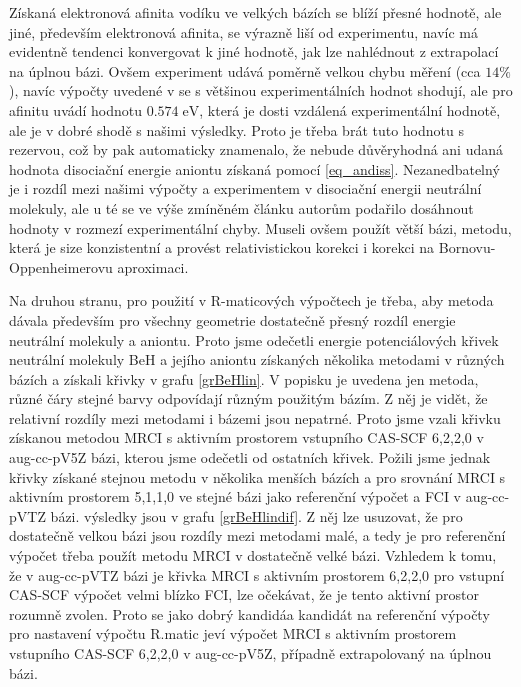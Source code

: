 Získaná elektronová afinita vodíku ve velkých bázích se blíží přesné 
hodnotě, ale jiné, především elektronová afinita, se výrazně liší od 
experimentu, navíc má evidentně tendenci konvergovat k jiné hodnotě, jak lze nahlédnout 
z extrapolací na úplnou bázi. Ovšem experiment udává poměrně velkou chybu měření (cca $14\%$),
navíc výpočty uvedené v \cite{Koput_BeH, Koput_BeHan} se s většinou experimentálních  
hodnot shodují, ale pro afinitu uvádí hodnotu $0.574\;\mathrm{eV}$, která je dosti 
vzdálená 
experimentální hodnotě, ale je v dobré shodě s našimi výsledky. Proto je třeba brát tuto hodnotu s rezervou, což by pak automaticky znamenalo, že nebude 
důvěryhodná ani udaná hodnota disociační energie aniontu získaná pomocí
\eqref{eq_andiss}. Nezanedbatelný je i rozdíl mezi našimi výpočty a experimentem v 
disociační energii neutrální molekuly, ale u té se ve výše zmíněném článku 
\cite{Koput_BeH} autorům podařilo dosáhnout hodnoty v rozmezí experimentální chyby.
Museli ovšem použít větší bázi,  
metodu, která je size konzistentní a provést relativistickou korekci i korekci na 
Bornovu-Oppenheimerovu aproximaci. 

Na druhou stranu, pro použití v R-maticových výpočtech je třeba, aby metoda dávala   
především pro všechny geometrie dostatečně přesný rozdíl energie neutrální molekuly a 
aniontu. Proto jsme odečetli energie potenciálových křivek neutrální molekuly BeH a jejího aniontu
získaných několika metodami v různých bázích a získali křivky v grafu \ref{grBeHlin}.
V popisku je uvedena jen metoda, různé čáry stejné barvy odpovídají různým použitým bázím.
Z něj je vidět, že relativní rozdíly mezi metodami i bázemi jsou nepatrné. Proto jsme
vzali křivku získanou metodou MRCI s aktivním prostorem vstupního CAS-SCF 6,2,2,0 v 
aug-cc-pV5Z bázi, kterou jsme odečetli od ostatních křivek. Požili jsme jednak křivky 
získané stejnou metodu v několika menších bázích a pro srovnání MRCI s aktivním 
prostorem 5,1,1,0 ve stejné bázi jako referenční výpočet a FCI v aug-cc-pVTZ bázi.
výsledky jsou v grafu \ref{grBeHlindif}. Z něj lze usuzovat, že pro dostatečně velkou 
bázi jsou rozdíly mezi metodami malé, a tedy je pro referenční výpočet třeba 
použít metodu MRCI v dostatečně velké bázi. Vzhledem k tomu, že v aug-cc-pVTZ bázi je 
křivka MRCI s aktivním prostorem 6,2,2,0 pro vstupní CAS-SCF výpočet velmi blízko FCI, 
lze očekávat, že je tento aktivní prostor rozumně zvolen. Proto se jako dobrý kandidáa 
kandidát na referenční výpočty pro nastavení výpočtu R.matic jeví výpočet MRCI s aktivním 
prostorem vstupního CAS-SCF 6,2,2,0 v aug-cc-pV5Z, případně
extrapolovaný na úplnou bázi.


